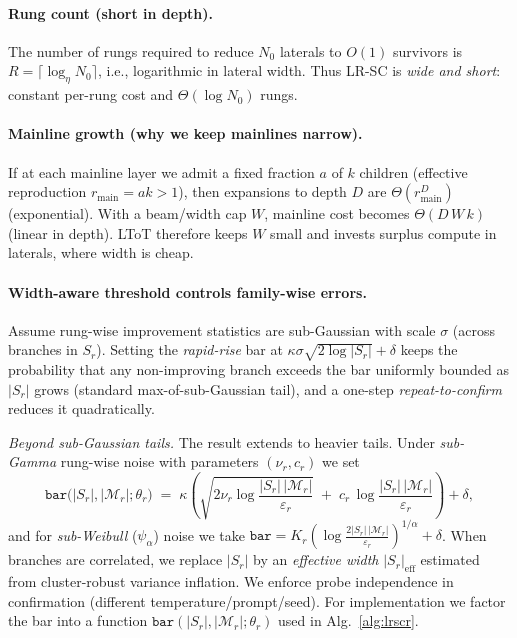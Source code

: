 \documentclass{article}
\begin{document}
\paragraph{Rung count (short in depth).}
The number of rungs required to reduce $N_0$ laterals to $O(1)$ survivors is
$R=\lceil \log_\eta N_0\rceil$, i.e., logarithmic in lateral width.
Thus LR-SC is \emph{wide and short}: constant per-rung cost and $\Theta(\log N_0)$ rungs.

\paragraph{Mainline growth (why we keep mainlines narrow).}
If at each mainline layer we admit a fixed fraction $a$ of $k$ children (effective reproduction $r_{\text{main}}=ak>1$), then expansions to depth $D$ are $\Theta(r_{\text{main}}^D)$ (exponential).
With a beam/width cap $W$, mainline cost becomes $\Theta(D\,W\,k)$ (linear in depth).
LToT therefore keeps $W$ small and invests surplus compute in laterals, where width is cheap.

\paragraph{Width-aware threshold controls family-wise errors.}
Assume rung-wise improvement statistics are sub-Gaussian with scale $\sigma$ (across branches in $S_r$).
Setting the \emph{rapid-rise} bar at $\kappa\sigma\sqrt{2\log|S_r|}+\delta$ keeps the probability that any non-improving branch exceeds the bar uniformly bounded as $|S_r|$ grows (standard max-of-sub-Gaussian tail), and a one-step \emph{repeat-to-confirm} reduces it quadratically.

\emph{Beyond sub-Gaussian tails.} The result extends to heavier tails.
Under \emph{sub-Gamma} rung-wise noise with parameters $(\nu_r,c_r)$ we set
\begin{equation}
\texttt{bar}\big(|S_r|,|\mathcal{M}_r|;\theta_r\big)\;=\;\kappa\!\left(\sqrt{2\nu_r\log\frac{|S_r|\,|\mathcal{M}_r|}{\varepsilon_r}}\;+\;c_r\,\log\frac{|S_r|\,|\mathcal{M}_r|}{\varepsilon_r}\right)+\delta,
\end{equation}
and for \emph{sub-Weibull} ($\psi_\alpha$) noise we take
$\texttt{bar}=K_r\!\left(\log\frac{2|S_r|\,|\mathcal{M}_r|}{\varepsilon_r}\right)^{1/\alpha}+\delta$.
When branches are correlated, we replace $|S_r|$ by an \emph{effective width} $|S_r|_{\mathrm{eff}}$ estimated from cluster-robust variance inflation.
We enforce probe independence in confirmation (different temperature/prompt/seed).
For implementation we factor the bar into a function $\texttt{bar}(|S_r|,|\mathcal{M}_r|;\theta_r)$ used in Alg.~\ref{alg:lrscr}.
\end{document}
